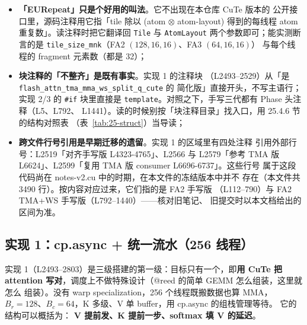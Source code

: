 \begin{itemize}[itemsep=2pt,topsep=2pt]
  \item \textbf{「EURepeat」只是个好用的叫法}。它不出现在本仓库 CuTe 版本的
        公开接口里，源码注释用它指「tile 除以 (atom $\otimes$ atom-layout)
        得到的每线程 atom 重复数」。读注释时把它翻译回 \texttt{Tile} 与
        \texttt{AtomLayout} 两个参数即可；能实测断言的是
        \texttt{tile\_\allowbreak{}size\_\allowbreak{}mnk}（FA2 $(128,16,16)$、FA3 $(64,16,16)$）
        与每个线程的 fragment 元素数（都是 32）；
  \item \textbf{块注释的「不整齐」是既有事实}。实现 1 的注释块
        （L2493--2529）从「是 \texttt{flash\_\allowbreak{}attn\_\allowbreak{}tma\_\allowbreak{}mma\_\allowbreak{}ws\_\allowbreak{}split\_\allowbreak{}q\_\allowbreak{}cute} 的
        简化版」直接开头，不写主语行；实现 2/3 的 \texttt{\#if} 块里直接是
        \texttt{template}。对照之下，手写三代都有 Phase 头注释（L5、L792、
        L1441）。读的时候别按「块注释目录」找入口，用 25.4.6 节的结构对照表
        （表~\ref{tab:25-struct}）当导读；
  \item \textbf{跨文件行号引用是早期迁移的遗留}。实现 1 的区域里有四处注释
        引用外部行号：L2519「对齐手写版 L4323-4765」、L2566 与 L2579「参考
        TMA 版 L6624」、L2599「复用 TMA 版 consumer L6696-6737」。这些行号
        属于这段代码尚在 notes-v2.cu 中的时期，在本文件的冻结版本中并不
        存在（本文件共 3490 行）。按内容对应过来，它们指的是 FA2 手写版
        （L112--790）与 FA2 TMA+WS 手写版（L792--1440）——核对旧笔记、
        旧提交时以本文档给出的区间为准。
\end{itemize}

\subsection{实现 1：cp.async + 统一流水（256 线程）}

实现 1（L2493--2803）是三级搭建的第一级：目标只有一个，即\textbf{用 CuTe 把
attention 写对}，调度上不做特殊设计（@reed 的简单 GEMM 怎么组装，这里就怎么
组装）。没有 warp specialization，256 个线程既搬数据也算 MMA，
$B_r{=}128$、$B_c{=}64$，K 多级、V 单 buffer，用 cp.async 的组栈管理等待。
它的结构可以概括为：
\textbf{V 提前发、K 提前一步、softmax 填 V 的延迟}。



